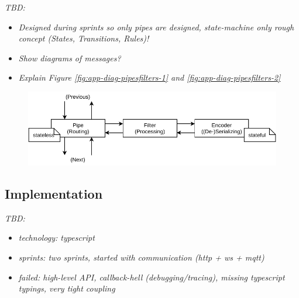 \emph{TBD:}
\begin{itemize}
    \item \emph{Designed during sprints so only pipes are designed, state-machine only rough concept (States, Transitions, Rules)!}
    \item \emph{Show diagrams of messages?}
    \item \emph{Explain Figure \ref{fig:app-diag-pipesfilters-1} and \ref{fig:app-diag-pipesfilters-2}}
\end{itemize}


\begin{figure}
    \centering
    \includegraphics[width=14cm]{img/ch04/Architecture - Pipes and Filters3.pdf}
    \label{fig:design-pipes-and-filters}
\end{figure}


\subsection{Implementation}
\emph{TBD:}  %
\begin{itemize}
    \item \emph{technology: typescript}
    \item \emph{sprints: two sprints, started with communication (http + ws + mqtt)}
    \item \emph{failed: high-level API, callback-hell (debugging/tracing), missing typescript typings, very tight coupling}
\end{itemize}

